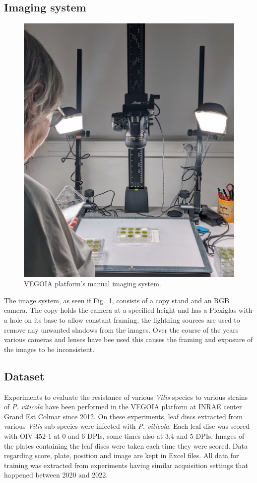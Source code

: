 \documentclass[english]{article}
\begin{document}
\subsection{Imaging system}

\begin{figure}[H]
    \begin{center}
        \includegraphics[width=0.5\linewidth]{2023_a_oiv_imaging_system.jpg}
        \caption{VEGOIA platform's manual imaging system.}\label{fig:vegoia}
    \end{center}
\end{figure}
The image system, as seen if Fig.~\ref{fig:vegoia}, consists of a copy stand and an RGB camera. The copy holds the camera at a specified height and has a Plexiglas with a hole on its base to allow constant framing, the lightning sources are used to remove any unwanted shadows from the images. Over the course of the years various cameras and lenses have bee used this causes the framing and exposure of the images to be inconsistent.

\subsection{Dataset}
Experiments to evaluate the resistance of various \textit{Vitis} species to various strains of \textit{P. viticola} have been performed in the VEGOIA platform at INRAE center Grand Est Colmar since 2012. On these experiments, leaf discs extracted from various \textit{Vitis} sub-species were infected with \textit{P. viticola}. Each leaf disc was scored with OIV 452-1 at 0 and 6 DPIs, some times also at 3,4 and 5 DPIs. Images of the plates containing the leaf discs were taken each time they were scored. Data regarding score, plate, position and image are kept in Excel files.
All data for training was extracted from experiments having similar acquisition settings that happened between 2020 and 2022.
\end{document}
